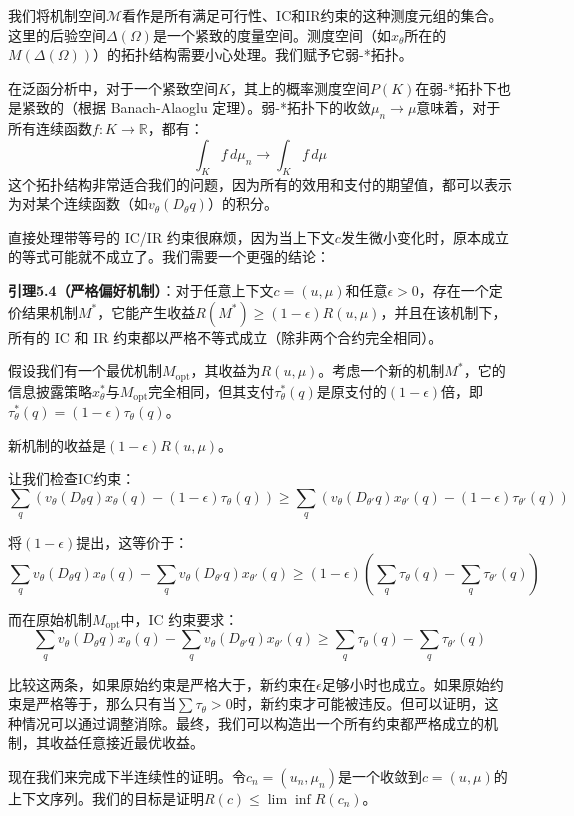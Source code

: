 我们将机制空间$\mathcal{M}$看作是所有满足可行性、IC和IR约束的这种测度元组的集合。这里的后验空间$\Delta(\Omega)$是一个紧致的度量空间。测度空间（如$x_\theta$所在的$M(\Delta(\Omega))$）的拓扑结构需要小心处理。我们赋予它弱-*拓扑。

在泛函分析中，对于一个紧致空间$K$，其上的概率测度空间$P(K)$在弱-*拓扑下也是紧致的（根据 Banach-Alaoglu 定理）。弱-*拓扑下的收敛$\mu_n\to\mu$意味着，对于所有连续函数$f:K\to\mathbb{R}$，都有：
$$\int_K f \, d\mu_n\to \int_K f \, d\mu$$
这个拓扑结构非常适合我们的问题，因为所有的效用和支付的期望值，都可以表示为对某个连续函数（如$v_\theta(D_\theta q)$）的积分。

直接处理带等号的 IC/IR 约束很麻烦，因为当上下文$c$发生微小变化时，原本成立的等式可能就不成立了。我们需要一个更强的结论：

\textbf{引理5.4（严格偏好机制）}：对于任意上下文$c=(u,\mu)$和任意$\epsilon >0$，存在一个定价结果机制$M^*$，它能产生收益$R(M^*)\geq (1-\epsilon)R(u,\mu)$，并且在该机制下，所有的 IC 和 IR 约束都以严格不等式成立（除非两个合约完全相同）。

假设我们有一个最优机制$M_{\text{opt}}$，其收益为$R(u,\mu)$。考虑一个新的机制$M^*$，它的信息披露策略$x^*_{\theta}$与$M_{\text{opt}}$完全相同，但其支付$\tau_{\theta}^*(q)$是原支付的$(1-\epsilon)$倍，即$\tau^*_{\theta}(q) = (1 - \epsilon)\tau_{\theta}(q)$。

新机制的收益是$(1-\epsilon)R(u,\mu)$。

让我们检查IC约束：
$$\sum\limits_{q}(v_\theta(D_{\theta}q)x_\theta(q) - (1 - \epsilon)\tau_\theta(q))\geq \sum\limits_{q}\left(v_\theta(D_{\theta'}q)x_{\theta'}(q) - (1 - \epsilon)\tau_{\theta'}(q)\right)$$

将$(1-\epsilon)$提出，这等价于：
$$\sum\limits_{q}v_\theta(D_{\theta}q)x_{\theta}(q)-\sum\limits_{q}v_{\theta}(D_{\theta'}q)x_{\theta'}(q)\geq (1 - \epsilon)\left(\sum\limits_{q}\tau_{\theta}(q) - \sum\limits_{q}\tau_{\theta'}(q)\right)$$

而在原始机制$M_{\text{opt}}$中，IC 约束要求：
$$\sum\limits_{q} v_{\theta}(D_{\theta}q)x_{\theta}(q)-\sum\limits_{q}v_{\theta}(D_{\theta'}q)x_{\theta'}(q)\geq \sum\limits_{q}\tau_{\theta}(q)-\sum\limits_{q}\tau_{\theta'}(q)$$

比较这两条，如果原始约束是严格大于，新约束在$\epsilon$足够小时也成立。如果原始约束是严格等于，那么只有当$\sum \tau_{\theta}>0$时，新约束才可能被违反。但可以证明，这种情况可以通过调整消除。最终，我们可以构造出一个所有约束都严格成立的机制，其收益任意接近最优收益。

现在我们来完成下半连续性的证明。令$c_n = (u_n,\mu_n)$是一个收敛到$c=(u,\mu)$的上下文序列。我们的目标是证明$R(c)\leq \lim\inf R(c_n)$。

